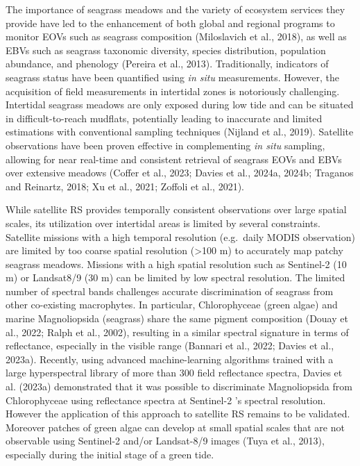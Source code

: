 \documentclass[
  letterpaper,
  11pt,
  english,
  singlespacing,
  headsepline]{MastersDoctoralThesis}
\begin{document}
\begin{spacing}{1.5}
The importance of seagrass meadows and the variety of ecosystem services
they provide have led to the enhancement of both global and regional
programs to monitor EOVs such as seagrass composition (Miloslavich et
al., 2018), as well as EBVs such as seagrass taxonomic diversity,
species distribution, population abundance, and phenology (Pereira et
al., 2013). Traditionally, indicators of seagrass status have been
quantified using \emph{in situ} measurements. However, the acquisition
of field measurements in intertidal zones is notoriously challenging.
Intertidal seagrass meadows are only exposed during low tide and can be
situated in difficult-to-reach mudflats, potentially leading to
inaccurate and limited estimations with conventional sampling techniques
(Nijland et al., 2019). Satellite observations have been proven
effective in complementing \emph{in situ} sampling, allowing for near
real-time and consistent retrieval of seagrass EOVs and EBVs over
extensive meadows (Coffer et al., 2023; Davies et al., 2024a, 2024b;
Traganos and Reinartz, 2018; Xu et al., 2021; Zoffoli et al., 2021).

While satellite RS provides temporally consistent observations over
large spatial scales, its utilization over intertidal areas is limited
by several constraints. Satellite missions with a high temporal
resolution (e.g.~daily MODIS observation) are limited by too coarse
spatial resolution (\textgreater100 m) to accurately map patchy seagrass
meadows. Missions with a high spatial resolution such as Sentinel-2 (10
m) or Landsat8/9 (30 m) can be limited by low spectral resolution. The
limited number of spectral bands challenges accurate discrimination of
seagrass from other co-existing macrophytes. In particular,
Chlorophyceae (green algae) and marine Magnoliopsida (seagrass) share
the same pigment composition (Douay et al., 2022; Ralph et al., 2002),
resulting in a similar spectral signature in terms of reflectance,
especially in the visible range (Bannari et al., 2022; Davies et al.,
2023a). Recently, using advanced machine-learning algorithms trained
with a large hyperspectral library of more than 300 field reflectance
spectra, Davies et al. (2023a) demonstrated that it was possible to
discriminate Magnoliopsida from Chlorophyceae using reflectance spectra
at Sentinel-2 's spectral resolution. However the application of this
approach to satellite RS remains to be validated. Moreover patches of
green algae can develop at small spatial scales that are not observable
using Sentinel-2 and/or Landsat-8/9 images (Tuya et al., 2013),
especially during the initial stage of a green tide.


\end{spacing}
\end{document}
